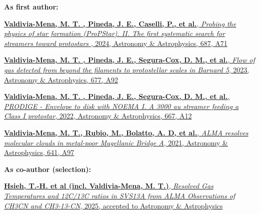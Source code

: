 \vspace{10pt}

\begin{cvparagraph}
\textbf{As first author:}
\vspace{4pt}
\begin{cvitems} %
	\item{\href{https://ui.adsabs.harvard.edu/abs/2024A%26A...687A..71V/abstract}{ \textbf{Valdivia-Mena, M. T. , Pineda, J. E., Caselli, P., et al.}, \textit{Probing the physics of star formation (ProPStar). II. The first systematic search for streamers toward protostars }, 2024, Astronomy \& Astrophysics, 687, A71}}
	\item{\href{https://ui.adsabs.harvard.edu/abs/2023A%26A...677A..92V/abstract}{ \textbf{Valdivia-Mena, M. T. , Pineda, J. E., Segura-Cox, D. M., et al.}, \textit{Flow of gas detected from beyond the filaments to protostellar scales in Barnard 5}, 2023, Astronomy \& Astrophysics, 677, A92}}
	\item{\href{https://ui.adsabs.harvard.edu/abs/2022A%26A...667A..12V/abstract}{\textbf{Valdivia-Mena, M. T. , Pineda, J. E., Segura-Cox, D. M., et al.}, \textit{PRODIGE - Envelope to disk with NOEMA I. A 3000 au streamer feeding a Class I protostar}, 2022, Astronomy \& Astrophysics, 667, A12} }
	\item{\href{https://ui.adsabs.harvard.edu/abs/2020A%26A...641A..97V/abstract}{ \textbf{Valdivia-Mena, M. T., Rubio, M., Bolatto, A. D, et al.}, \textit{ALMA resolves molecular clouds in metal-poor Magellanic Bridge A}, 2021, Astronomy \& Astrophysics, 641, A97}}
\end{cvitems}
\vspace{8pt}
\textbf{As co-author (selection):}
\vspace{4pt}
\begin{cvitems} %
    \item{\href{https://ui.adsabs.harvard.edu/abs/2025arXiv250202873H/abstract}{\textbf{Hsieh, T.-H. et al (incl. Valdivia-Mena, M. T.)}, \textit{Resolved Gas Temperatures and 12C/13C ratios in SVS13A from ALMA Observations of CH3CN and CH3-13-CN}, 2025, accepted to Astronomy \& Astrophysics}}
    

\end{cvitems}
\end{cvparagraph}
